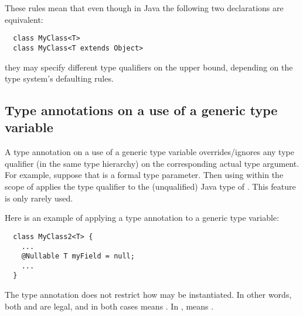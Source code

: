 These rules mean that even though in Java the following two declarations
are equivalent:

\begin{Verbatim}
  class MyClass<T>
  class MyClass<T extends Object>
\end{Verbatim}

\noindent
they may specify different type qualifiers on the upper bound, depending on
the type system's defaulting rules.



\subsection{Type annotations on a use of a generic type variable\label{type-variable-use}}

A type annotation on a use of a generic type variable overrides/ignores any type
qualifier (in the same type hierarchy) on the corresponding actual type
argument.  For example, suppose that  is a formal type parameter.
Then using  within the scope of  applies the type
qualifier  to the (unqualified) Java type of \@.
This feature is only rarely used.

Here is an example of applying a type annotation to a generic type
variable:

\begin{Verbatim}
  class MyClass2<T> {
    ...
    @Nullable T myField = null;
    ...
  }
\end{Verbatim}

\noindent
The type annotation does not restrict how  may be
instantiated.  In other words, both
 and  are
legal, and in both cases  means .
In ,
 means .





